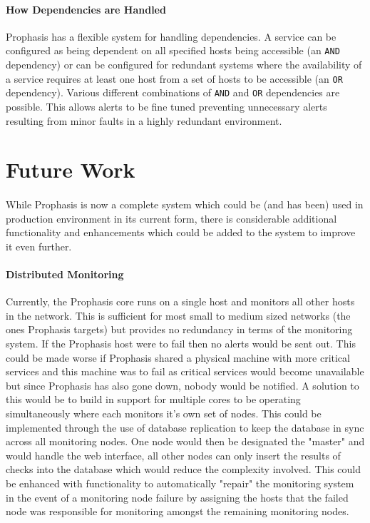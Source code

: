 \documentclass[bsc,logo,twoside,singlespacing,notimes]{infthesis}
\begin{document}
\paragraph*{How Dependencies are Handled}
	Prophasis has a flexible system for handling dependencies. A service can be
	configured as being dependent on all specified hosts being accessible (an
	\texttt{AND} dependency) or can be configured for redundant systems where the
	availability of a service requires at least one host from a set of hosts to be
	accessible (an \texttt{OR} dependency).  Various different combinations of 
	\texttt{AND} and \texttt{OR} dependencies are possible.  This allows alerts to
	be fine tuned preventing unnecessary alerts resulting from minor faults in a
	highly redundant environment.


\section{Future Work}
\label{future-work}
\paragraph*{}
	While Prophasis is now a complete system which could be (and has been) used in
	production environment in its current form, there is considerable additional
	functionality and enhancements which could be added to the system to improve
	it even further.
	
\paragraph*{Distributed Monitoring}
	Currently, the Prophasis core runs on a single host and monitors all other
	hosts in the network.  This is sufficient for most small to medium sized
	networks (the ones Prophasis targets) but provides no redundancy in terms of
	the monitoring system.  If the Prophasis host were to fail then no alerts would
	be sent out. This could be made worse if Prophasis shared a physical machine
	with more critical services and this machine was to fail as critical services
	would become unavailable but since Prophasis has also gone down, nobody would
	be notified.  A solution to this would be to build in support for multiple
	cores to be operating simultaneously where each monitors it's own set of nodes.
	This could be implemented through the use of database replication to keep the
	database in sync across all monitoring nodes.  One node would then be
	designated the "master" and would handle the web interface, all other nodes can
	only insert the results of checks into the database which would reduce the
	complexity involved.  This could be enhanced with functionality to
	automatically "repair" the monitoring system in the event of a monitoring node
	failure by assigning the hosts that the failed node was responsible for
	monitoring amongst the remaining monitoring nodes.
	
\end{document}
